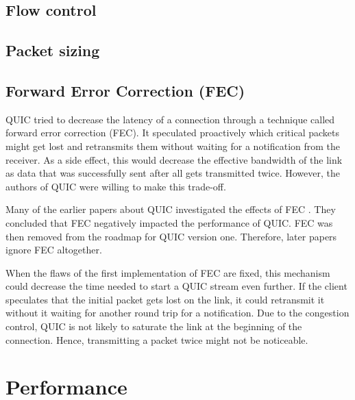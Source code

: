 \documentclass[conference]{IEEEtran}
\begin{document}
\subsection{Flow control}

\subsection{Packet sizing}
% 

\subsection{Forward Error Correction (FEC)}

QUIC tried to decrease the latency of a connection through a technique called forward error correction (FEC). It speculated proactively which critical packets might get lost and retransmits them without waiting for a notification from the receiver. As a side effect, this would decrease the effective bandwidth of the link as data that was successfully sent after all gets transmitted twice. However, the authors of QUIC were willing to make this trade-off. 

Many of the earlier papers about QUIC investigated the effects of FEC \cite{HTTPoverUDP}. They concluded that FEC negatively impacted the performance of QUIC. FEC was then removed from the roadmap for QUIC version one. Therefore, later papers ignore FEC altogether.

When the flaws of the first implementation of FEC are fixed, this mechanism could decrease the time needed to start a QUIC stream even further. If the client speculates that the initial packet gets lost on the link, it could retransmit it without it waiting for another round trip for a notification. Due to the congestion control, QUIC is not likely to saturate the link at the beginning of the connection. Hence, transmitting a packet twice might not be noticeable.


\section{Performance}
\label{sec:performance}
\end{document}
